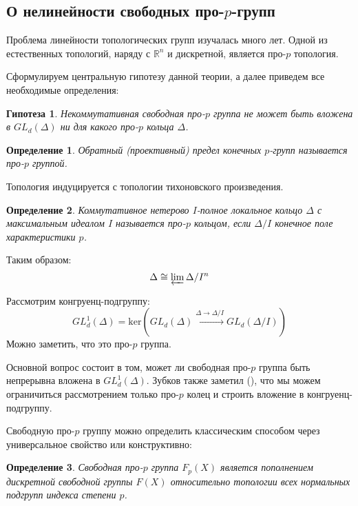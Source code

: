 \documentclass[12pt,a4paper]{article}
\newtheorem{definition}{Определение}[section]
\newtheorem{conjecture}{Гипотеза}[section]
\begin{document}
    \subsection{О нелинейности свободных про-$p$-групп}
    Проблема линейности топологических групп изучалась много лет.
    Одной из естественных топологий, наряду с $\mathbb{R}^n$ и дискретной, является про-$p$ топология.

    Сформулируем центральную гипотезу данной теории, а далее приведем все необходимые определения:

    \vskip 0.1in\noindent
    \begin{conjecture}
        Некоммутативная свободная про-$p$ группа не может быть вложена в $GL_d(\Delta)$ ни для какого про-$p$ кольца $\Delta$.
    \end{conjecture}
    \vskip 0.1in\noindent

    \vskip 0.1in\noindent
    \begin{definition}
        Обратный (проективный) предел конечных $p$-групп называется про-$p$ группой.
    \end{definition}
    \vskip 0.1in\noindent
    Топология индуцируется с топологии тихоновского произведения.

    \vskip 0.1in\noindent
    \begin{definition}
        Коммутативное нетерово $I$-полное локальное кольцо $\Delta$ с максимальным идеалом $I$ называется про-$p$ кольцом, если $\Delta/I$ конечное поле характеристики $p$.
    \end{definition}
    \vskip 0.1in\noindent

    Таким образом:
    \[
        \Delta \cong \varprojlim \Delta/I^n
    \]

    Рассмотрим конгруенц-подгруппу:
    \[
        GL_d^1(\Delta) = \mathrm{ker}\left( GL_d(\Delta) \xrightarrow{\Delta\to\Delta/I} GL_d(\Delta/I) \right)
    \]
    Можно заметить, что это про-$p$ группа.


    Основной вопрос состоит в том, может ли свободная про-$p$ группа быть непрерывна вложена в $GL_d^1(\Delta)$.
    Зубков также заметил (\cite{Zubkov}), что мы можем ограничиться рассмотрением только про-$p$ колец и строить вложение в конгруенц-подгруппу.

    Свободную про-$p$ группу можно определить классическим способом через универсальное свойство или конструктивно:

    \vskip 0.1in\noindent
    \begin{definition}
        Свободная про-$p$ группа $F_p(X)$ является пополнением дискретной свободной группы $F(X)$ относительно топологии всех нормальных подгрупп индекса степени $p$.
    \end{definition}
    \vskip 0.1in\noindent
\end{document}
